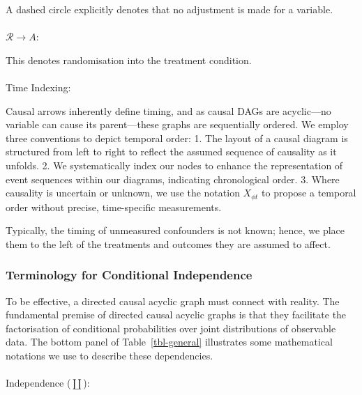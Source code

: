 \documentclass[
  single column]{article}
\makeatletter
\let\oldparagraph\paragraph
\renewcommand{\paragraph}{
    \@ifstar
      \xxxParagraphStar
      \xxxParagraphNoStar
  }
\newcommand{\xxxParagraphStar}[1]{\oldparagraph*{#1}\mbox{}}
\newcommand{\xxxParagraphNoStar}[1]{\oldparagraph{#1}\mbox{}}
\makeatother
\begin{document}
A dashed circle explicitly denotes that no adjustment is made for a
variable.

\paragraph{\texorpdfstring{\(\mathcal{R} \rightarrow A\):}{\textbackslash mathcal\{R\} \textbackslash rightarrow A:}}\label{mathcalr-rightarrow-a}

This denotes randomisation into the treatment condition.

\paragraph{Time Indexing:}\label{time-indexing}

Causal arrows inherently define timing, and as causal DAGs are
acyclic---no variable can cause its parent---these graphs are
sequentially ordered. We employ three conventions to depict temporal
order: 1. The layout of a causal diagram is structured from left to
right to reflect the assumed sequence of causality as it unfolds. 2. We
systematically index our nodes to enhance the representation of event
sequences within our diagrams, indicating chronological order. 3. Where
causality is uncertain or unknown, we use the notation \(X_{\phi t}\) to
propose a temporal order without precise, time-specific measurements.

Typically, the timing of unmeasured confounders is not known; hence, we
place them to the left of the treatments and outcomes they are assumed
to affect.

\subsubsection{Terminology for Conditional
Independence}\label{terminology-for-conditional-independence}

To be effective, a directed causal acyclic graph must connect with
reality. The fundamental premise of directed causal acyclic graphs is
that they facilitate the factorisation of conditional probabilities over
joint distributions of observable data. The bottom panel of
Table~\ref{tbl-general} illustrates some mathematical notations we use
to describe these dependencies.

\paragraph{\texorpdfstring{Independence
(\(\coprod\)):}{Independence (\textbackslash coprod):}}\label{independence-coprod}
\end{document}
